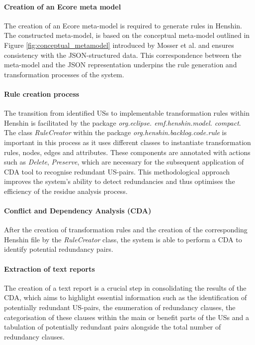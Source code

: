 \paragraph{Creation of an Ecore meta model}\label{workflow_ecore}
The creation of an Ecore meta-model is required to generate rules in Henshin. The constructed meta-model, is based on the conceptual meta-model outlined in Figure \ref{fig:conceptual_metamodel} introduced by Mosser et al. and ensures consistency with the JSON-structured data. This correspondence between the meta-model and the JSON representation underpins the rule generation and transformation processes of the system.

\paragraph{Rule creation process}\label{workflow_rule_creator}
The transition from identified USs to implementable transformation rules within Henshin is facilitated by the package \textit{org.eclipse. emf.henshin.model. compact}. The class \textit{RuleCreator} within the package \textit{org.henshin.backlog.code.rule} is important in this process as it uses different classes to instantiate transformation rules, nodes, edges and attributes. These components are annotated with actions such as \textit{Delete}, \textit{Preserve},  which are necessary  for the subsequent application of CDA tool to recognise redundant US-pairs. This methodological approach improves the system's ability to detect redundancies and thus optimises the efficiency of the residue analysis process.

\paragraph{Conflict and Dependency Analysis (CDA)} After the creation of transformation rules and the creation of the corresponding Henshin file by the \textit{RuleCreator} class, the system is able to perform a CDA to identify potential redundancy pairs.

\paragraph{Extraction of text reports} The creation of a text report is a crucial step in consolidating the results of the CDA, which aims to highlight essential information such as the identification of potentially redundant US-pairs, the enumeration of redundancy clauses, the categorisation of these clauses within the main or benefit parts of the USs and a tabulation of potentially redundant pairs alongside the total number of redundancy clauses.


